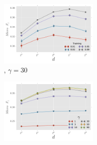 \begin{figure}[t!]
	\centering	
		\begin{subfigure}[b]{\columnwidth}	
			\begin{subfigure}[b]{\columnwidth}
    		    \begin{subfigure}[b]{0.5\columnwidth}    
    		    		\centering
    	            \includegraphics[width=\columnwidth]{figures/stability/flickr_training_vs_dimensions}%
			        \renewcommand\thesubfigure{\alph{subfigure}1}%
	                \caption{\flickr, $\gamma=30$}    	            
    	            \label{fig:stability_flickr-dims_vs_training}
	    	    \end{subfigure}%
	        \begin{subfigure}[b]{0.5\columnwidth}
    		    		\centering	        
	                \includegraphics[width=\columnwidth]{figures/stability/flickr_walks_per_node_vs_dimensions}%

\end{subfigure}
\end{subfigure}
\end{subfigure}
\end{figure}
